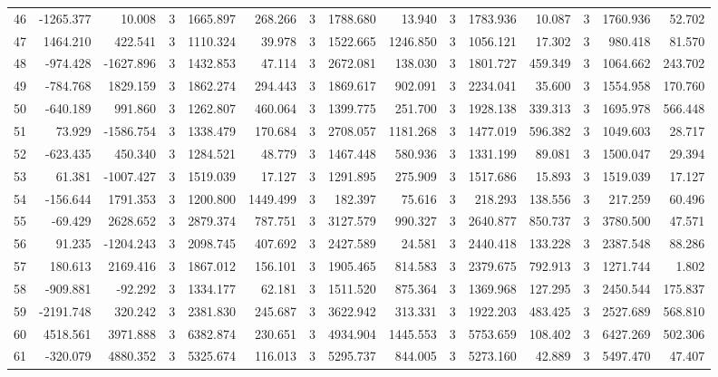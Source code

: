 \begin{table}[ht]
\begin{tabular}{lrrrrrrrrrrrrrr}
46 & -1265.377 & 10.008 & 3 & 1665.897 & 268.266 & 3 & 1788.680 & 13.940 & 3 & 1783.936 & 10.087 & 3 & 1760.936 & 52.702 \\
47 & 1464.210 & 422.541 & 3 & 1110.324 & 39.978 & 3 & 1522.665 & 1246.850 & 3 & 1056.121 & 17.302 & 3 & 980.418 & 81.570 \\
48 & -974.428 & -1627.896 & 3 & 1432.853 & 47.114 & 3 & 2672.081 & 138.030 & 3 & 1801.727 & 459.349 & 3 & 1064.662 & 243.702 \\
49 & -784.768 & 1829.159 & 3 & 1862.274 & 294.443 & 3 & 1869.617 & 902.091 & 3 & 2234.041 & 35.600 & 3 & 1554.958 & 170.760 \\
50 & -640.189 & 991.860 & 3 & 1262.807 & 460.064 & 3 & 1399.775 & 251.700 & 3 & 1928.138 & 339.313 & 3 & 1695.978 & 566.448 \\
51 & 73.929 & -1586.754 & 3 & 1338.479 & 170.684 & 3 & 2708.057 & 1181.268 & 3 & 1477.019 & 596.382 & 3 & 1049.603 & 28.717 \\
52 & -623.435 & 450.340 & 3 & 1284.521 & 48.779 & 3 & 1467.448 & 580.936 & 3 & 1331.199 & 89.081 & 3 & 1500.047 & 29.394 \\
53 & 61.381 & -1007.427 & 3 & 1519.039 & 17.127 & 3 & 1291.895 & 275.909 & 3 & 1517.686 & 15.893 & 3 & 1519.039 & 17.127 \\
54 & -156.644 & 1791.353 & 3 & 1200.800 & 1449.499 & 3 & 182.397 & 75.616 & 3 & 218.293 & 138.556 & 3 & 217.259 & 60.496 \\
55 & -69.429 & 2628.652 & 3 & 2879.374 & 787.751 & 3 & 3127.579 & 990.327 & 3 & 2640.877 & 850.737 & 3 & 3780.500 & 47.571 \\
56 & 91.235 & -1204.243 & 3 & 2098.745 & 407.692 & 3 & 2427.589 & 24.581 & 3 & 2440.418 & 133.228 & 3 & 2387.548 & 88.286 \\
57 & 180.613 & 2169.416 & 3 & 1867.012 & 156.101 & 3 & 1905.465 & 814.583 & 3 & 2379.675 & 792.913 & 3 & 1271.744 & 1.802 \\
58 & -909.881 & -92.292 & 3 & 1334.177 & 62.181 & 3 & 1511.520 & 875.364 & 3 & 1369.968 & 127.295 & 3 & 2450.544 & 175.837 \\
59 & -2191.748 & 320.242 & 3 & 2381.830 & 245.687 & 3 & 3622.942 & 313.331 & 3 & 1922.203 & 483.425 & 3 & 2527.689 & 568.810 \\
60 & 4518.561 & 3971.888 & 3 & 6382.874 & 230.651 & 3 & 4934.904 & 1445.553 & 3 & 5753.659 & 108.402 & 3 & 6427.269 & 502.306 \\
61 & -320.079 & 4880.352 & 3 & 5325.674 & 116.013 & 3 & 5295.737 & 844.005 & 3 & 5273.160 & 42.889 & 3 & 5497.470 & 47.407 \\

\end{tabular}
\end{table}
